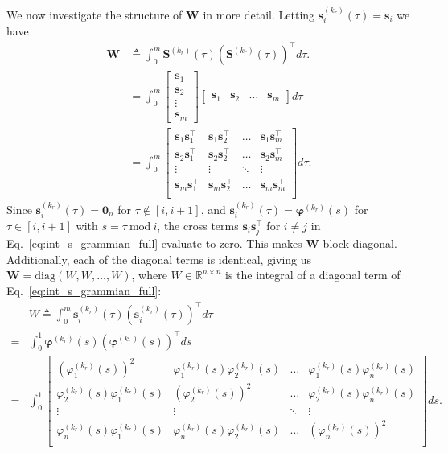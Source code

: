 We now investigate the structure of $\mathbf{W}$ in more detail.
Letting $\mathbf{s}_i^{(k_r)}(\tau) = \mathbf{s}_i$ we have
\begin{align}
	\mathbf{W} &\triangleq \int_0^m \mathbf{S}^{(k_r)}(\tau) (\mathbf{S}^{(k_r)} (\tau))^\top d\tau. \\
	&= \int_0^m 
	\begin{bmatrix}
		\mathbf{s}_1 \\		
		\mathbf{s}_2 \\		
		\vdots \\
		\mathbf{s}_m
	\end{bmatrix}
	\begin{bmatrix}
		\mathbf{s}_1 &
		\mathbf{s}_2 &
		\dots &
		\mathbf{s}_m 
	\end{bmatrix} d\tau \\
	&= \int_0^m 
	\begin{bmatrix}
		\mathbf{s}_1 \mathbf{s}_1^\top & \mathbf{s}_1 \mathbf{s}_2^\top & \dots & \mathbf{s}_1 \mathbf{s}_m^\top\\		
		\mathbf{s}_2 \mathbf{s}_1^\top & \mathbf{s}_2 \mathbf{s}_2^\top & \dots & \mathbf{s}_2 \mathbf{s}_m^\top\\		
		\vdots & \vdots & \ddots & \vdots \\
		\mathbf{s}_m \mathbf{s}_1^\top & \mathbf{s}_m \mathbf{s}_2^\top & \dots & \mathbf{s}_m \mathbf{s}_m^\top\\		
	\end{bmatrix} d\tau. 
	\label{eq:int_s_grammian_full}
\end{align}
Since $\mathbf{s}^{(k_r)}_i(\tau) = \mathbf{0}_n$ for $\tau \not\in [i, i+1]$, and 
$\mathbf{s}^{(k_r)}_i(\tau) = \boldsymbol{\varphi}^{(k_r)}(s)$ for $\tau \in [i, i+1]$ with $s = \tau\:\text{mod}\:i$,
the cross terms $\mathbf{s}_i \mathbf{s}_j^\top$ for $i \neq j$ in Eq.~\ref{eq:int_s_grammian_full} evaluate to zero.
This makes $\mathbf{W}$ block diagonal.
Additionally, each of the diagonal terms is identical, giving us $\mathbf{W} = \mathrm{diag}(W, W, \dots, W)$, where
${W} \in \mathbb{R}^{n \times n}$ is the integral of a diagonal term of Eq.~\ref{eq:int_s_grammian_full}:
\begin{align}
	&{W} \triangleq \int_0^m \mathbf{s}^{(k_r)}_i(\tau) (\mathbf{s}^{(k_r)}_i(\tau))^\top d\tau \\
	=& \int_0^1 \boldsymbol{\varphi}^{(k_r)}(s) (\boldsymbol{\varphi}^{(k_r)}(s))^\top ds \\
	=& \int_0^1 
	\begin{bmatrix}
		(\varphi_1^{(k_r)}(s))^2 & \varphi_1^{(k_r)}(s) \varphi_2^{(k_r)}(s) & \dots & \varphi_1^{(k_r)}(s) \varphi_n^{(k_r)}(s)\\		
		\varphi_2^{(k_r)}(s) \varphi_1^{(k_r)}(s) & (\varphi_2^{(k_r)}(s))^2 & \dots & \varphi_2^{(k_r)}(s) \varphi_n^{(k_r)}(s)\\		
		\vdots & \vdots & \ddots & \vdots \\
		\varphi_n^{(k_r)}(s) \varphi_1^{(k_r)}(s) & \varphi_n^{(k_r)}(s) \varphi_2^{(k_r)}(s) & \dots & (\varphi_n^{(k_r)}(s))^2\\		
	\end{bmatrix} ds. 
\end{align}
